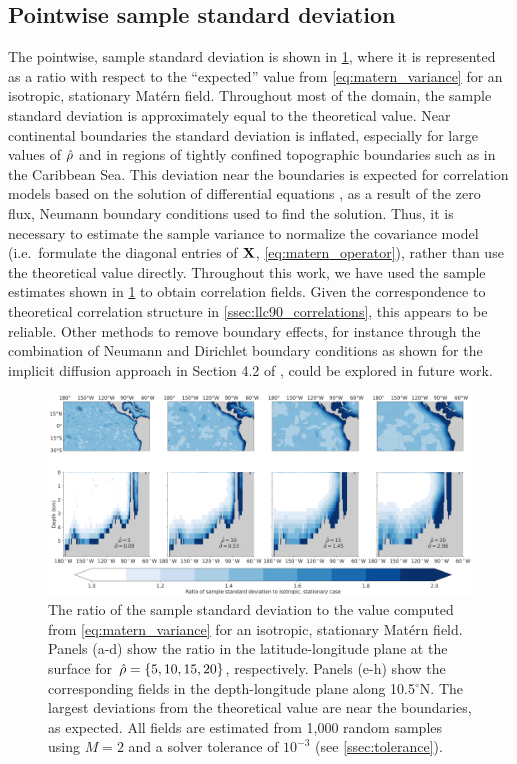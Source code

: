 \subsection{Pointwise sample standard deviation}
\label{ssec:llc90_boundary_effects}


The pointwise, sample standard deviation is shown in \cref{fig:std_ratio}, where
it is represented as a ratio with respect to the ``expected'' value from
\cref{eq:matern_variance} for an isotropic, stationary Mat\'ern field.
Throughout most of the domain, the sample standard deviation is approximately
equal to the theoretical value.
Near continental boundaries the standard deviation is inflated, especially
for large values of $\hat{\rho}$ and in regions of tightly confined topographic
boundaries such as in the Caribbean Sea.
This deviation near the boundaries is expected for correlation models based on
the solution of differential equations
\citep[e.g.][]{weaver_correlation_2001,RSSB:RSSB777}, as a result of the zero
flux, Neumann boundary conditions used to find the solution.
Thus, it is necessary to estimate the sample variance to normalize the
covariance model (i.e.\ formulate the diagonal entries of $\mathbf{X}$,
\cref{eq:matern_operator}), rather than use the theoretical value directly.
Throughout this work, we have used the sample estimates shown in
\cref{fig:std_ratio} to obtain correlation fields.
Given the correspondence to theoretical correlation structure in
\cref{ssec:llc90_correlations}, this appears to be reliable.
Other methods to remove boundary effects, for instance through the
combination of Neumann and Dirichlet boundary conditions as shown for the
implicit diffusion approach in Section 4.2 of
\citet{mirouze_representation_2010}, could be explored in future work.

\begin{figure}
    \centering
    \includegraphics[width=\textwidth]{../figures/std_ratio_02apps.jpg}
    \caption{The ratio of the sample standard deviation to the value computed
        from \cref{eq:matern_variance} for an isotropic, stationary Mat\'ern
        field. Panels (a-d) show the ratio in the latitude-longitude plane at
        the surface for $\hat{\rho}=\{5,10,15,20\}$, respectively. Panels (e-h)
        show the corresponding fields in the depth-longitude plane along 10.5$^\circ$N.
        The largest deviations from the theoretical value are near the boundaries, as
        expected.
        All fields are estimated from 1,000 random samples using $M=2$ and a
        solver tolerance of $10^{-3}$ (see \cref{ssec:tolerance}).
    }
    \label{fig:std_ratio}
\end{figure}

